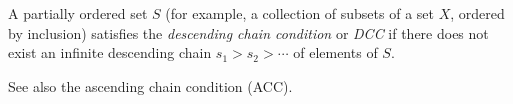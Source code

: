 \documentclass[12pt]{article}
\begin{document}
A partially ordered set $S$ (for example, a collection of subsets of a set $X$, ordered by inclusion) satisfies the {\it descending chain condition} or {\it DCC} if there does not exist an infinite descending chain $s_1 > s_2 > \cdots$ of elements of $S$.

See also the ascending chain condition (ACC).
\end{document}
